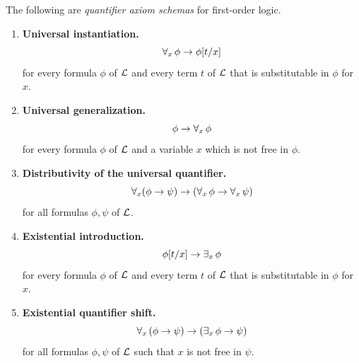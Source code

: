 \documentclass[10pt]{amsart}
\begin{document}
\begin{definition}
	The following are \textit{quantifier axiom schemas} for first-order logic.
	\begin{enumerate}[label=\textbf{\arabic*.}]
		\item \textbf{Universal instantiation.}
		      $$\forall_x\,\phi \rightarrow \phi[t/x]$$
		      for every formula $\phi$ of ${\mathcal L}$ and every term $t$ of ${\mathcal L}$ that is substitutable in $\phi$ for $x$.
		\item \textbf{Universal generalization.}
		      $$\phi \rightarrow \forall_x\,\phi$$
		      for every formula $\phi$ of ${\mathcal L}$ and a variable $x$ which is not free in $\phi$.
		\item \textbf{Distributivity of the universal quantifier.}
		      $$\forall_x(\phi \rightarrow \psi) \rightarrow \left(\forall_x\,\phi \rightarrow \forall_x\,\psi\right)$$
		      for all formulas $\phi,\psi$ of ${\mathcal L}$.
		\item \textbf{Existential introduction.}
		      $$\phi[t/x] \rightarrow \exists_x\,\phi$$
		      for every formula $\phi$ of ${\mathcal L}$ and every term $t$ of ${\mathcal L}$ that is substitutable in $\phi$ for $x$.
		\item \textbf{Existential quantifier shift.}
		      $$\forall_x\left(\phi \rightarrow \psi\right) \rightarrow \left(\exists_x\,\phi \rightarrow \psi\right)$$
		      for all formulas $\phi,\psi$ of ${\mathcal L}$ such that $x$ is not free in $\psi$.
	\end{enumerate}
\end{definition}
\end{document}

